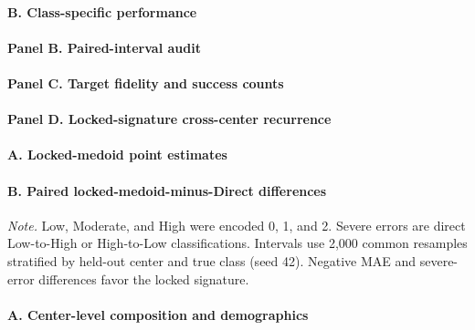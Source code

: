 

\paragraph*{B. Class-specific performance}





\paragraph*{Panel B. Paired-interval audit}



\paragraph*{Panel C. Target fidelity and success counts}



\paragraph*{Panel D. Locked-signature cross-center recurrence}



\paragraph*{A. Locked-medoid point estimates}



\paragraph*{B. Paired locked-medoid-minus-Direct differences}



{\footnotesize\noindent\textit{Note.} Low, Moderate, and High were encoded 0, 1, and 2. Severe errors are direct Low-to-High or High-to-Low classifications. Intervals use 2,000 common resamples stratified by held-out center and true class (seed 42). Negative MAE and severe-error differences favor the locked signature.\par}

\paragraph*{A. Center-level composition and demographics}

